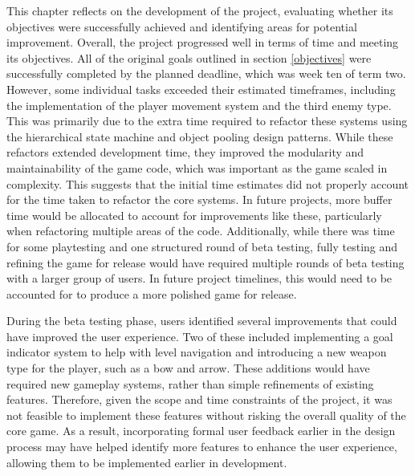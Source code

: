 \documentclass[10pt]{final_report}
\begin{document}
This chapter reflects on the development of the project, evaluating whether its objectives were successfully achieved and identifying areas for potential improvement. 
\newline
Overall, the project progressed well in terms of time and meeting its objectives. All of the original goals outlined in section \ref{objectives} were successfully completed by the planned deadline, which was week ten of term two. However, some individual tasks exceeded their estimated timeframes, including the implementation of the player movement system and the third enemy type. This was primarily due to the extra time required to refactor these systems using the hierarchical state machine and object pooling design patterns.
While these refactors extended development time, they improved the modularity and maintainability of the game code, which was important as the game scaled in complexity. This suggests that the initial time estimates did not properly account for the time taken to refactor the core systems. In future projects, more buffer time would be allocated to account for improvements like these, particularly when refactoring multiple areas of the code.
\newline
Additionally, while there was time for some playtesting and one structured round of beta testing, fully testing and refining the game for release would have required multiple rounds of beta testing with a larger group of users. In future project timelines, this would need to be accounted for to produce a more polished game for release. \newline

During the beta testing phase, users identified several improvements that could have improved the user experience. Two of these included implementing a goal indicator system to help with level navigation and introducing a new weapon type for the player, such as a bow and arrow. These additions would have required new gameplay systems, rather than simple refinements of existing features. Therefore, given the scope and time constraints of the project, it was not feasible to implement these features without risking the overall quality of the core game.
As a result, incorporating formal user feedback earlier in the design process may have helped identify more features to enhance the user experience, allowing them to be implemented earlier in development. \newline
\end{document}
